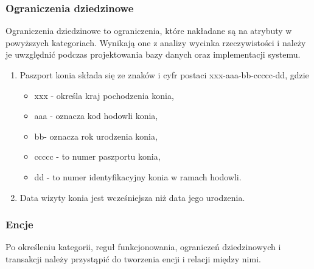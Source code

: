 \documentclass[12pt,oneside]{report}
\begin{document}
\subsubsection{Ograniczenia dziedzinowe}
Ograniczenia dziedzinowe to ograniczenia, które nakładane są na atrybuty w powyższych kategoriach. Wynikają one z analizy wycinka rzeczywistości i należy je uwzględnić podczas projektowania bazy danych oraz implementacji systemu.
\begin{enumerate}[start=1,label={\bfseries OGR\textbackslash 00\arabic*}]
	\item Paszport konia składa się ze znaków i cyfr postaci xxx-aaa-bb-ccccc-dd, gdzie
	\begin{itemize} 
		\item xxx - określa kraj pochodzenia konia,  
		\item aaa - oznacza kod hodowli konia, 
		\item bb- oznacza rok urodzenia konia, 
		\item ccccc - to numer paszportu konia, 
		\item dd - to numer identyfikacyjny konia w ramach hodowli.
		\end{itemize}
	\item Data wizyty konia jest wcześniejsza niż data jego urodzenia.
\end{enumerate}
\newpage
\subsubsection{Encje}
Po określeniu kategorii, reguł funkcjonowania, ograniczeń dziedzinowych i transakcji należy przystąpić do tworzenia encji i relacji między nimi.
\\
\end{document}

